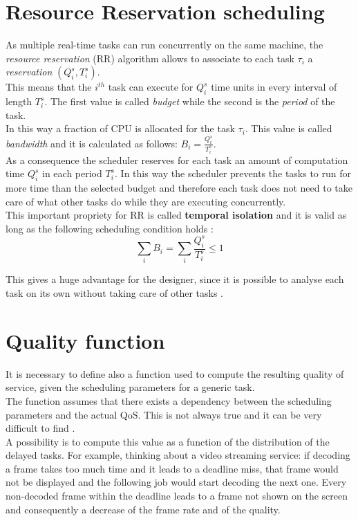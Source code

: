 \section{Resource Reservation scheduling}
As multiple real-time tasks can run concurrently on the same machine, the \emph{resource reservation} (RR) algorithm allows to associate to each task \( \tau_{i} \) a \emph{reservation} \( \left(Q_{i}^s, T_{i}^s\right) \).\\ 
This means that the \( i^{th} \) task can execute for \( Q_{i}^s \) time units in every interval of length \( T_{i}^s \). The first value is called \emph{budget} while the second is the \emph{period} of the task.\\
In this way a fraction of CPU is allocated for the task \( \tau_{i} \). This value is called \emph{bandwidth} and it is calculated as follows: \( B_{i} = \frac{Q_{i}^s}{T_{i}^s}\).\\
As a consequence the scheduler reserves for each task an amount of computation time \( Q_{i}^s \) in each period \( T_{i}^s \). In this way the scheduler prevents the tasks to run for more time than the selected budget and therefore each task does not need to take care of what other tasks do while they are executing concurrently.\\
This important propriety for RR is called \textbf{temporal isolation} and it is valid as long as the following scheduling condition holds \cite{realtimehandbook}:
\begin{equation} \tag{1} \label{schedCond}
  \displaystyle\sum_{i} B_{i} =  \displaystyle\sum_{i} \frac{Q_{i}^s}{T_{i}^s} \leq 1
\end{equation}

This gives a huge advantage for the designer, since it is possible to analyse each task on its own without taking care of other tasks \cite{probGuarantees}.

\section{Quality function}
It is necessary to define also a function used to compute the resulting quality of service, given the scheduling parameters for a generic task.\\
The function assumes that there exists a dependency between the scheduling parameters and the actual QoS. This is not always true and it can be very difficult to find \cite{prosit}.\\
A possibility is to compute this value as a function of the distribution of the delayed tasks. For example, thinking about a video streaming service: if decoding a frame takes too much time and it leads to a deadline miss, that frame would not be displayed and the following job would start decoding the next one. Every non-decoded frame within the deadline leads to a frame not shown on the screen and consequently a decrease of the frame rate and of the quality. 

